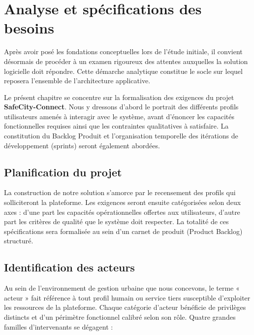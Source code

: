 
\chapter{Analyse et spécifications des besoins}

Après avoir posé les fondations conceptuelles lors de l'étude initiale, il convient désormais de procéder à un examen rigoureux des attentes auxquelles la solution logicielle doit répondre. Cette démarche analytique constitue le socle sur lequel reposera l'ensemble de l'architecture applicative.

Le présent chapitre se concentre sur la formalisation des exigences du projet \textbf{SafeCity-Connect}. Nous y dressons d'abord le portrait des différents profils utilisateurs amenés à interagir avec le système, avant d'énoncer les capacités fonctionnelles requises ainsi que les contraintes qualitatives à satisfaire. La constitution du Backlog Produit et l'organisation temporelle des itérations de développement (sprints) seront également abordées.

\section{Planification du projet}
La construction de notre solution s'amorce par le recensement des profils qui solliciteront la plateforme. Les exigences seront ensuite catégorisées selon deux axes : d'une part les capacités opérationnelles offertes aux utilisateurs, d'autre part les critères de qualité que le système doit respecter. La totalité de ces spécifications sera formalisée au sein d'un carnet de produit (Product Backlog) structuré.

\section{Identification des acteurs}
Au sein de l'environnement de gestion urbaine que nous concevons, le terme « acteur » fait référence à tout profil humain ou service tiers susceptible d'exploiter les ressources de la plateforme. Chaque catégorie d'acteur bénéficie de privilèges distincts et d'un périmètre fonctionnel calibré selon son rôle. Quatre grandes familles d'intervenants se dégagent :

